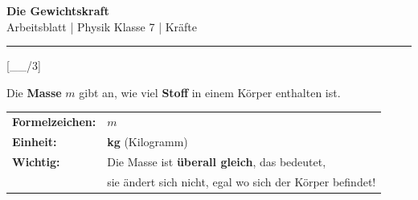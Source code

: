 \documentclass[11pt, a4paper]{article}
\newcommand{\fach}{Physik}
\newcommand{\thema}{Die Gewichtskraft}
\newcommand{\klasse}{7}
\newcommand{\lsg}[1]{\textcolor{loesung}{\textbf{#1}}}
\newcommand{\punktebox}[1]{\hfill\small\textcolor{mittelgrau}{[\_\_/#1]}}
\begin{document}

\begin{center}
    {\Large\bfseries\textcolor{fachfarbe}{\thema}}\\[0.2em]
    {\small Arbeitsblatt | \fach{} Klasse \klasse{} | Kräfte}
\end{center}
\vspace{-0.3em}
\hrule
\vspace{0.6em}


\begin{merkkasten}[title={Merksatz 1: Die Masse}]
\punktebox{3}

\vspace{-0.5em}
Die \textbf{Masse} $m$ gibt an, wie viel \lsg{Stoff} in einem Körper enthalten ist.

\vspace{0.3em}
\begin{tabular}{@{}ll@{}}
\textbf{Formelzeichen:} & $m$ \\
\textbf{Einheit:} & \lsg{kg} (Kilogramm) \\
\textbf{Wichtig:} & Die Masse ist \lsg{überall gleich}, das bedeutet, \\
                  & sie ändert sich nicht, egal wo sich der Körper befindet!
\end{tabular}
\end{merkkasten}

\end{document}
